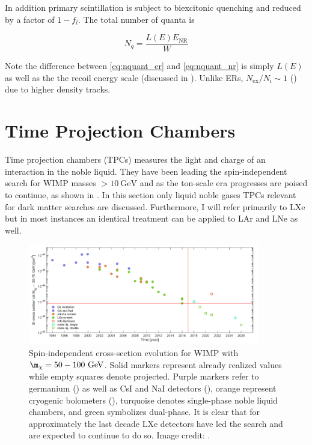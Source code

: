 In addition primary scintillation is subject to biexcitonic quenching and reduced by a factor of $1 - f_{l}$.  The total number of quanta
is

\begin{equation}
N_{q} = \frac{L(E) E_{\mathrm{NR}}}{W}
\label{eq:nquant_nr}
\end{equation}

\noindent Note the difference between \eqref{eq:nquant_er} and \eqref{eq:nquant_nr} is simply $L(E)$ as well as the the recoil energy
scale (discussed in ).  Unlike ERs, $N_{\mathrm{ex}} / N_{\mathrm{i}} \sim 1$ () due to
higher density tracks.



\section{Time Projection Chambers}
\label{sec:tpcs}
Time projection chambers (TPCs) measures the light and charge of an interaction in the noble liquid.  They have been leading the
spin-independent search for WIMP masses $> 10\ \mathrm{GeV}$ and as the ton-scale era progresses are poised to continue, as shown in
.  In this section
only liquid noble gases TPCs relevant for dark matter searches are discussed.  Furthermore, I will refer primarily to LXe but in
most instances an identical treatment can be applied to LAr and LNe as well.

\begin{figure}
\centering
\includegraphics[width=0.9\textwidth]{SensitivityEvolutionBetter}
\caption{Spin-independent cross-section evolution for WIMP with $\m_{\chi} = 50-100\ \mathrm{GeV}$.  Solid markers represent already realized
values while empty squares denote projected.  Purple markers refer to germanium () as well as CsI and NaI
detectors (), orange represent cryogenic bolometers (), turquoise denotes single-phase
noble liquid chambers, and green symbolizes dual-phase.  It is
clear that for approximately the last decade LXe detectors have led the search and are
expected to continue to do so.  Image credit: .}
\label{fig:sensitivity_evo}
\end{figure}

